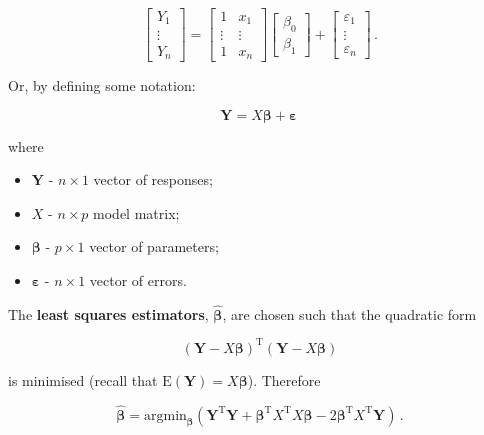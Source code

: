 \documentclass[
]{book}
\providecommand{\tightlist}{%
  \setlength{\itemsep}{0pt}\setlength{\parskip}{0pt}}
\theoremstyle{definition}
\theoremstyle{definition}
\theoremstyle{definition}
\theoremstyle{definition}
\theoremstyle{remark}
\begin{document}
\begin{equation*}
\left[ \begin{array}{c}
Y_1\\
\vdots\\
Y_n\end{array}\right]
=\left[ \begin{array}{cc}
1&x_{1}\\
\vdots&\vdots\\
1&x_{n}\end{array}\right]
\left[ \begin{array}{c}
\beta_{0}\\
\beta_{1}\end{array}\right]
+\left[ \begin{array}{c}
\varepsilon_{1}\\
\vdots\\
\varepsilon_{n}\end{array}\right]\,.
\end{equation*}

Or, by defining some notation:

\begin{equation}
\boldsymbol{Y}=X\boldsymbol{\beta}+\boldsymbol{\varepsilon}\,
\label{eq:matrix-model}
\end{equation}

where

\begin{itemize}
\tightlist
\item
  \(\boldsymbol{Y}\) - \(n\times 1\) vector of responses;
\item
  \(X\) - \(n\times p\) model matrix;
\item
  \(\boldsymbol{\beta}\) - \(p\times 1\) vector of parameters;
\item
  \(\boldsymbol{\varepsilon}\) - \(n\times 1\) vector of errors.
\end{itemize}

The \textbf{least squares estimators}, \(\hat{\boldsymbol{\beta}}\), are chosen such that the quadratic form

\begin{equation*}
(\boldsymbol{Y}-X\boldsymbol{\beta})^{\textrm{T}}(\boldsymbol{Y}-X\boldsymbol{\beta})
\end{equation*}

is minimised (recall that \(\textrm{E}(\textbf{Y})=X\boldsymbol{\beta}\)). Therefore

\begin{equation*}
\hat{\boldsymbol{\beta}} = \textrm{argmin}_{\boldsymbol{\beta}}(\boldsymbol{Y}^{\textrm{T}}\boldsymbol{Y}+\boldsymbol{\beta}^{\textrm{T}}X^{\textrm{T}}X\boldsymbol{\beta}
-2\boldsymbol{\beta}^{\textrm{T}}X^{\textrm{T}}\boldsymbol{Y})\,.
\end{equation*}
\end{document}
